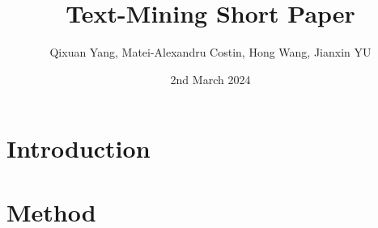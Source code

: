 \documentclass{article}
\title{Text-Mining Short Paper}
\author{Qixuan Yang, Matei-Alexandru Costin, Hong Wang, Jianxin YU}
\date{2nd March 2024}
\begin{document}
\maketitle

\section{Introduction}
\cite{yao2019docred}

\section{Method}



\end{document}
